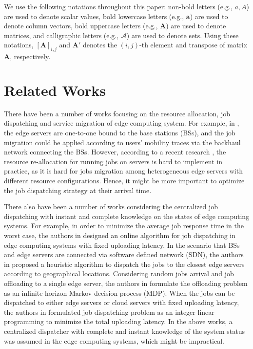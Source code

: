 We use the following notations throughout this paper: 
non-bold letters (e.g., $a, A$) are used to denote scalar values,
bold lowercase letters (e.g., $\mathbf{a}$) are used to denote column vectors,
bold uppercase letters (e.g., $\mathbf{A}$) are used to denote matrices,
and calligraphic letters (e.g., $\mathcal{A}$) are used to denote sets.
Using these notations, $[\mathbf{A}]_{i,j}$ and $\mathbf{A}'$ denotes the $(i,j)$-th element and transpose of matrix $\mathbf{A}$, respectively.

\section{Related Works}
\label{sec:review}
There have been a number of works focusing on the resource allocation, job dispatching and service migration of edge computing system.
For example, in \cite{TON19-WangSq}, the edge servers are one-to-one bound to the base stations (BSs), and the job migration could be applied according to users' mobility traces via the backhaul network connecting the BSs.
However, according to a recent research \cite{INFOCOM19-WuC}, the resource re-allocation for running jobs on servers is hard to implement in practice, as it is hard for jobs migration among heterogeneous edge servers with different resource configurations.
Hence, it might be more important to optimize the job dispatching strategy at their arrival time.

There also have been a number of works considering the centralized job dispatching with instant and complete knowledge on the states of edge computing systems.
For example, in order to minimize the average job response time in the worst case, the authors in \cite{tan-online} designed an online algorithm for job dispatching in edge computing systems with fixed uploading latency.
In the scenario that BSs and edge servers are connected via software defined network (SDN), the authors in \cite{IOTJ18-FanQ} proposed a heuristic algorithm to dispatch the jobs to the closest edge servers according to geographical locations.
Considering random jobs arrival and job offloading to a single edge server, the authors in \cite{mdp-globecom,mdp-tvt} formulate the offloading problem as an infinite-horizon Markov decision process (MDP).
When the jobs can be dispatched to either edge servers or cloud servers with fixed uploading latency, the authors in \cite{MASS18-MengZ} formulated job dispatching problem as an integer linear programming to minimize the total uploading latency.
In the above works, a centralized dispatcher with complete and instant knowledge of the system status was assumed in the edge computing systems, which might be impractical.

